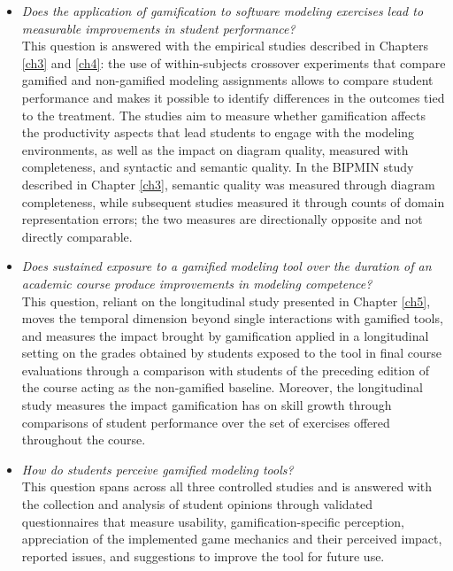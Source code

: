 \begin{itemize}
    \item[\textbf{TRQ1:}] \textit{Does the application of gamification to software modeling exercises lead to measurable improvements in student performance?}\\
    This question is answered with the empirical studies described in Chapters \ref{ch3} and \ref{ch4}: the use of within-subjects crossover experiments that compare gamified and non-gamified modeling assignments allows to compare student performance and makes it possible to identify differences in the outcomes tied to the treatment. The studies aim to measure whether gamification affects the productivity aspects that lead students to engage with the modeling environments, as well as the impact on diagram quality, measured with completeness, and syntactic and semantic quality. In the BIPMIN study described in Chapter \ref{ch3}, semantic quality was measured through diagram completeness, while subsequent studies measured it through counts of domain representation errors; the two measures are directionally opposite and not directly comparable.
    \item[\textbf{TRQ2:}] \textit{Does sustained exposure to a gamified modeling tool over the duration of an academic course produce improvements in modeling competence?}\\
    This question, reliant on the longitudinal study presented in Chapter \ref{ch5}, moves the temporal dimension beyond single interactions with gamified tools, and measures the impact brought by gamification applied in a longitudinal setting on the grades obtained by students exposed to the tool in final course evaluations through a comparison with students of the preceding edition of the course acting as the non-gamified baseline. Moreover, the longitudinal study measures the impact gamification has on skill growth through comparisons of student performance over the set of exercises offered throughout the course.
    \item[\textbf{TRQ3:}] \textit{How do students perceive gamified modeling tools?}\\
    This question spans across all three controlled studies and is answered with the collection and analysis of student opinions through validated questionnaires that measure usability, gamification-specific perception, appreciation of the implemented game mechanics and their perceived impact, reported issues, and suggestions to improve the tool for future use.
\end{itemize}


